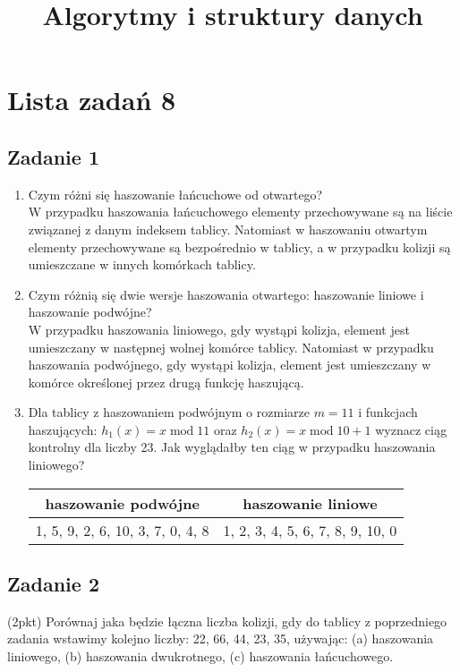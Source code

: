 \documentclass{article}
\begin{document}
\title{Algorytmy i struktury danych}
\author{}
\date{}
\maketitle

\section*{Lista zadań 8}

\subsection*{Zadanie 1}
\begin{enumerate}[label=(\alph*)]
	\item Czym różni się haszowanie łańcuchowe od otwartego? \\[1ex]
	      W przypadku haszowania łańcuchowego elementy przechowywane są na liście związanej z danym indeksem tablicy.
	      Natomiast w haszowaniu otwartym elementy przechowywane są bezpośrednio w tablicy, a w przypadku kolizji
	      są umieszczane w innych komórkach tablicy.
	\item Czym różnią się dwie wersje haszowania otwartego: haszowanie liniowe i haszowanie podwójne? \\[1ex]
	      W przypadku haszowania liniowego, gdy wystąpi kolizja, element jest umieszczany w następnej wolnej komórce
	      tablicy. Natomiast w przypadku haszowania podwójnego, gdy wystąpi kolizja, element jest umieszczany w komórce
	      określonej przez drugą funkcję haszującą.
	\item Dla tablicy z haszowaniem podwójnym o rozmiarze $m=11$ i funkcjach haszujących:
	      $h_1(x)=x \mathop{\mathrm{mod}} 11$  oraz $h_2(x)= x \mathop{\mathrm{mod}} 10+1$ wyznacz ciąg kontrolny
	      dla liczby 23. Jak wyglądałby ten ciąg w przypadku haszowania liniowego?
	      \begin{center}
		      \begin{tabular}{c | c}
			      \textbf{haszowanie podwójne}     & \textbf{haszowanie liniowe}      \\
			      \hline
			      1, 5, 9, 2, 6, 10, 3, 7, 0, 4, 8 & 1, 2, 3, 4, 5, 6, 7, 8, 9, 10, 0
		      \end{tabular}
	      \end{center}
\end{enumerate}

\subsection*{Zadanie 2}
(2pkt) Porównaj jaka będzie łączna liczba kolizji, gdy do tablicy z poprzedniego zadania wstawimy kolejno liczby:
22, 66, 44, 23, 35,  używając: (a) haszowania liniowego, (b) haszowania dwukrotnego, (c) haszowania łańcuchowego.
\end{document}
